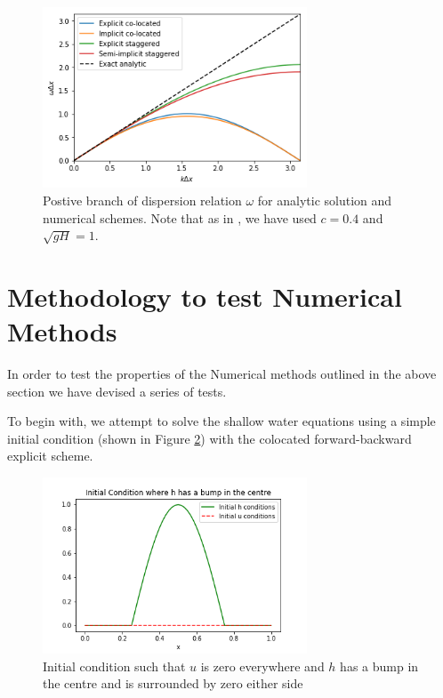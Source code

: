 \documentclass[a4paper,12pt, notitlepage]{report}
\begin{document}
\begin{figure}
	\centering
	\includegraphics[width=0.7\textwidth]{dispersion_graph.png}
	\caption{Postive branch of dispersion relation $\omega$ for analytic solution and numerical schemes. Note that as in \cite{MPE textbook}, we have used $c=0.4$ and $\sqrt{gH} = 1$.} \label{dispersionfigure}
\end{figure}

\section*{Methodology to test Numerical Methods}

In order to test the properties of the Numerical methods outlined in the above section we have devised a series of tests.

To begin with, we attempt to solve the shallow water equations using a simple initial condition (shown in Figure \ref{initialconditioncosbell}) with the colocated forward-backward explicit scheme.

\begin{figure}
	\centering
	\includegraphics[width=0.7\textwidth]{initial_condition_cosbell.png}
	\caption{Initial condition such that $u$ is zero everywhere and $h$ has a bump in the centre and is surrounded by zero either side} \label{initialconditioncosbell}
\end{figure}
\end{document}
